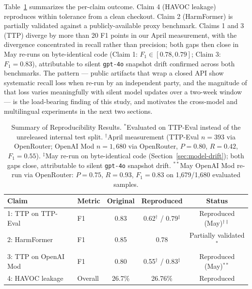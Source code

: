 \documentclass[10pt]{article} %
\begin{document}
Table~\ref{tab:reproducibility-summary} summarizes the per-claim outcome. Claim 4 (HAVOC leakage) reproduces within tolerance from a clean checkout. Claim 2 (HarmFormer) is partially validated against a publicly-available proxy benchmark. Claims 1 and 3 (TTP) diverge by more than 20 F1 points in our April measurement, with the divergence concentrated in recall rather than precision; both gaps then close in May re-runs on byte-identical code (Claim 1: $F_1 \in [0.78, 0.79]$; Claim 3: $F_1=0.83$), attributable to silent \texttt{gpt-4o} snapshot drift confirmed across both benchmarks. The pattern --- public artifacts that wrap a closed API show systematic recall loss when re-run by an independent party, and the magnitude of that loss varies meaningfully with silent model updates over a two-week window --- is the load-bearing finding of this study, and motivates the cross-model and multilingual experiments in the next two sections.

\begin{table}[H]
\centering
\begin{tabular}{llccc}
\hline
Claim & Metric & Original & Reproduced & Status \\
\hline
1: TTP on TTP-Eval & F1 & 0.83 & 0.62$^{\dagger}$ / 0.79$^{\ddagger}$ & Reproduced (May)$^{\dagger\ddagger}$ \\
2: HarmFormer & F1 & 0.85 & 0.78 & Partially validated$^*$ \\
3: TTP on OpenAI Mod & F1 & 0.80 & 0.55$^{\dagger}$ / 0.83$^{\ddagger}$ & Reproduced (May)$^{**}$ \\
4: HAVOC leakage & Overall & 26.7\% & 26.76\% & Reproduced \\
\hline
\end{tabular}
\caption{Summary of Reproducibility Results. $^*$Evaluated on TTP-Eval instead of the unreleased internal test split. $^{\dagger}$April measurement (TTP-Eval $n=393$ via OpenRouter; OpenAI Mod $n=1{,}680$ via OpenRouter, $P=0.80$, $R=0.42$, $F_1=0.55$). $^{\ddagger}$May re-run on byte-identical code (Section~\ref{sec:model-drift}); both gaps close, attributable to silent \texttt{gpt-4o} snapshot drift. $^{**}$May OpenAI Mod re-run via OpenRouter: $P=0.75$, $R=0.93$, $F_1=0.83$ on 1{,}679/1{,}680 evaluated samples.}
\label{tab:reproducibility-summary}
\end{table}
\end{document}

